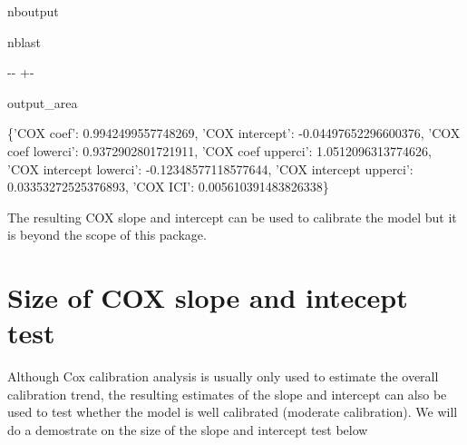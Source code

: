 \documentclass[letterpaper,10pt,english]{sphinxmanual}
\begin{document}
\begin{sphinxuseclass}{nboutput}
\begin{sphinxuseclass}{nblast}
{

\kern-\sphinxverbatimsmallskipamount\kern-\baselineskip
\kern+\FrameHeightAdjust\kern-\fboxrule
\vspace{\nbsphinxcodecellspacing}

\begin{sphinxuseclass}{output_area}
\begin{sphinxuseclass}{}


\begin{sphinxVerbatim}[commandchars=\\\{\}]
\llap{\color{nbsphinxout}[3]:\,\hspace{\fboxrule}\hspace{\fboxsep}}\{'COX coef': 0.9942499557748269,
 'COX intercept': -0.04497652296600376,
 'COX coef lowerci': 0.9372902801721911,
 'COX coef upperci': 1.0512096313774626,
 'COX intercept lowerci': -0.12348577118577644,
 'COX intercept upperci': 0.03353272525376893,
 'COX ICI': 0.005610391483826338\}
\end{sphinxVerbatim}



\end{sphinxuseclass}
\end{sphinxuseclass}
}

\end{sphinxuseclass}
\end{sphinxuseclass}
\sphinxAtStartPar
The resulting COX slope and intercept can be used to calibrate the model but it is beyond the scope of this package.


\section{Size of COX slope and intecept test}
\label{\detokenize{notebooks/cox:Size-of-COX-slope-and-intecept-test}}
\sphinxAtStartPar
Although Cox calibration analysis is usually only used to estimate the overall calibration trend, the resulting estimates of the slope and intercept can also be used to test whether the model is well calibrated (moderate calibration). We will do a demostrate on the size of the slope and intercept test below
\end{document}
